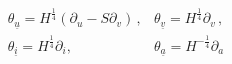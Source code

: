 \begin{equation}
\begin{array}{ll}
\theta _{\underline{u}}=H^{\frac{1}{4}}(\partial _{u}-S\partial _{v})\,, & 
\theta _{\underline{v}}=H^{\frac{1}{4}}\partial _{v}\,, \\[3mm] 
\theta _{\underline{i}}=H^{\frac{1}{4}}\partial _{i}, & \theta _{\underline{a%
}}=H^{-{\frac{1}{4}}}\partial _{a}
\end{array}
\end{equation}

